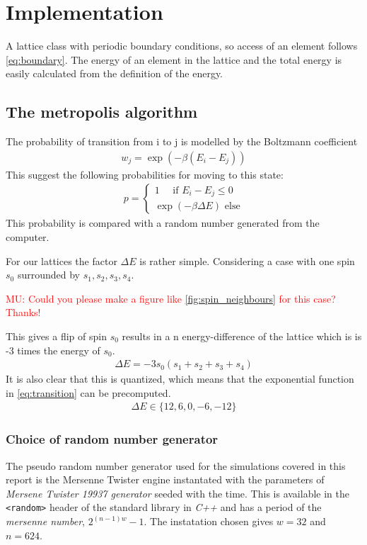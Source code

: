 \documentclass[11pt,a4paper,english]{article}
\numberwithin{equation}{section}
\begin{document}
\section{Implementation}

A lattice class with periodic boundary conditions, so access of an
element follows \eqref{eq:boundary}. The energy of an element in the 
lattice and the total energy is easily calculated from the definition
of the energy. 

\subsection{The metropolis algorithm}

The probability of transition from i to j 
is modelled by the Boltzmann coefficient
\begin{gather}
w_j = \exp(-\beta (E_i - E_j))
\end{gather}
This suggest the following probabilities for moving to this state:
\begin{gather}
p = \begin{cases}
1 \quad\text{ if }  E_i - E_j \le 0\\
\exp(-\beta \Delta E) \text{ else}
\end{cases}
\label{eq:transition}
\end{gather}
This probability is compared with a random number generated from 
the computer.

For our lattices the factor $\Delta E$ is rather simple. Considering 
a case with one spin $s_0$ surrounded by $s_1,s_2,s_3, s_4$. 

\textcolor{red}{MU: Could you please make a figure like \ref{fig:spin_neighbours}
for this case? Thanks!}

This gives a flip of spin $s_0$ results in a n
energy-difference of the lattice which is
is -3 times the energy of $s_0$.
\begin{gather}
\Delta E = -3s_0(s_1 + s_2 + s_3 + s_4)
\end{gather}
It is also clear that this is quantized, which means that the 
exponential function in \eqref{eq:transition} can be precomputed.
\begin{gather}
\Delta E \in \{12, 6, 0, -6, -12\}
\end{gather}




\subsubsection{Choice of random number generator}
The pseudo random number generator used for the simulations covered in 
this report is the Mersenne Twister engine
instantated with the parameters of 
\emph{Mersene Twister 19937 generator} seeded with the time.
This is available in the \texttt{<random>} header of the standard
library in \emph{C++} and has a period of the \emph{mersenne number}, $2^{(n-1)w}-1$.
The instatation chosen gives $w=32$ and $n=624$.	
\end{document}
